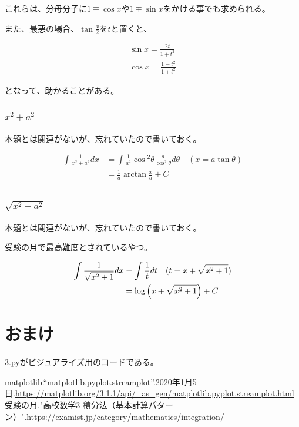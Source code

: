 \documentclass[a4paper, 10pt, dvipdfmx]{jlreq}
\begin{document}
これらは、分母分子に$1\mp\cos{x}$や$1\mp\sin{x}$をかける事でも求められる。

また、最悪の場合、$\tan{\frac{x}{2}}$を$t$と置くと、

\begin{align*}
  \sin{x}=\frac{2t}{1+t^2} \\
  \cos{x}=\frac{1-t^2}{1+t^2}
\end{align*}

となって、助かることがある。

\subsubsection{$x^2+a^2$}

本題とは関連がないが、忘れていたので書いておく。

\begin{align*}
  \int \frac{1}{x^2+a^2} dx & = \int \frac{1}{a^2}\cos{^2\theta} \frac{a}{\cos^2{\theta}}d\theta \quad (x=a\tan{\theta}) \\
                            & = \frac{1}{a}\arctan{\frac{x}{a}}+C                                                        \\
\end{align*}

\subsubsection{$\sqrt{x^2+a^2}$}

本題とは関連がないが、忘れていたので書いておく。

受験の月で最高難度とされているやつ。

\begin{align*}
  \int \frac{1}{\sqrt{x^2+1}} dx & = \int \frac{1}{t} dt \quad (t=x+\sqrt{x^2+1}) \\
                                 & = \log{\qty(x+\sqrt{x^2+1})}+C                 \\
\end{align*}


\section{おまけ}

\href{3.py}{3.py}がビジュアライズ用のコードである。



\begin{thebibliography}{9}
  matplotlib.“matplotlib.pyplot.streamplot”.2020年1月5日.\url{https://matplotlib.org/3.1.1/api/_as_gen/matplotlib.pyplot.streamplot.html}
  受験の月."高校数学3 積分法（基本計算パターン）".\url{https://examist.jp/category/mathematics/integration/}
\end{thebibliography}
\end{document}
